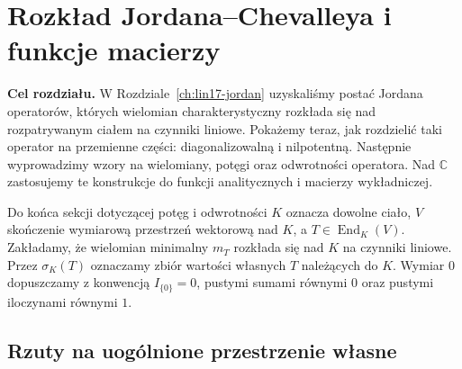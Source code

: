 \chapter{Rozkład Jordana--Chevalleya i funkcje macierzy}
\label{ch:lin18-jordan-chevalley}

\noindent\textbf{Cel rozdziału.}
W Rozdziale~\ref{ch:lin17-jordan}
uzyskaliśmy postać Jordana operatorów, których
wielomian charakterystyczny rozkłada się
nad rozpatrywanym ciałem na czynniki liniowe.
Pokażemy teraz, jak rozdzielić taki operator
na przemienne części: diagonalizowalną i nilpotentną.
Następnie wyprowadzimy wzory na wielomiany,
potęgi oraz odwrotności operatora.
Nad \(\mathbb C\) zastosujemy te konstrukcje
do funkcji analitycznych i macierzy wykładniczej.

Do końca sekcji dotyczącej potęg i odwrotności
\(K\) oznacza dowolne ciało,
\(V\) skończenie wymiarową przestrzeń wektorową
nad \(K\), a \(T\in\operatorname{End}_K(V)\).
Zakładamy, że wielomian minimalny \(m_T\)
rozkłada się nad \(K\) na czynniki liniowe.
Przez \(\sigma_K(T)\) oznaczamy zbiór wartości
własnych \(T\) należących do \(K\).
Wymiar \(0\) dopuszczamy z konwencją
\(I_{\{0\}}=0\), pustymi sumami równymi \(0\)
oraz pustymi iloczynami równymi \(1\).

\section{Rzuty na uogólnione przestrzenie własne}
\label{sec:lin18-generalized-projectors}


